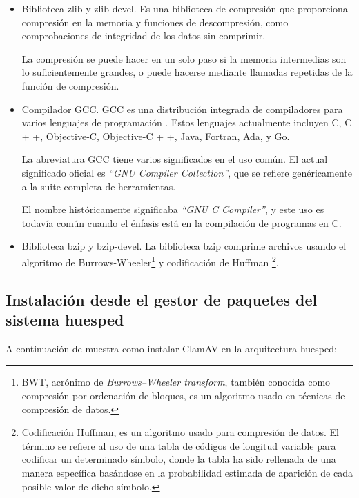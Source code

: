 \begin{itemize}

\item Biblioteca  zlib y zlib-devel. Es una biblioteca de compresión que 
proporciona compresión en la memoria y funciones de descompresión, como 
comprobaciones de integridad de los datos sin comprimir.

La compresión se puede hacer en un solo paso si la memoria intermedias son lo 
suficientemente grandes, o puede hacerse mediante llamadas repetidas de la 
función de compresión\cite{zlib}.


\item Compilador GCC. GCC es una distribución integrada de compiladores para 
varios lenguajes de programación . Estos lenguajes actualmente incluyen C, C + 
+, Objective-C, Objective-C + +, Java, Fortran, Ada, y Go.

La  abreviatura GCC tiene varios significados en el uso común. El actual 
significado oficial es \emph{``GNU Compiler Collection''}, que se refiere 
genéricamente a la suite completa de herramientas.

El nombre históricamente significaba \emph{``GNU C Compiler''}, y este uso es 
todavía común cuando el énfasis está en la compilación de programas en 
C\cite{gcc}.

\item Biblioteca bzip y bzip-devel. La biblioteca bzip comprime archivos 
usando el algoritmo de Burrows-Wheeler\footnote{BWT, acrónimo de 
\emph {Burrows–Wheeler transform}, también conocida como compresión por 
ordenación de bloques, es un algoritmo usado en técnicas de compresión de 
datos. } y codificación de Huffman \footnote{Codificación Huffman, es un 
algoritmo usado para compresión de datos. El término se refiere al uso de una 
tabla de códigos de longitud variable para codificar un determinado símbolo, 
donde la tabla ha sido rellenada de una manera específica basándose en la 
probabilidad estimada de aparición de cada posible valor de dicho símbolo.}.

\end{itemize}

\subsection{Instalación desde  el gestor  de paquetes del sistema  
huesped}

A continuaci\'on de  muestra como instalar  ClamAV en la arquitectura huesped:

